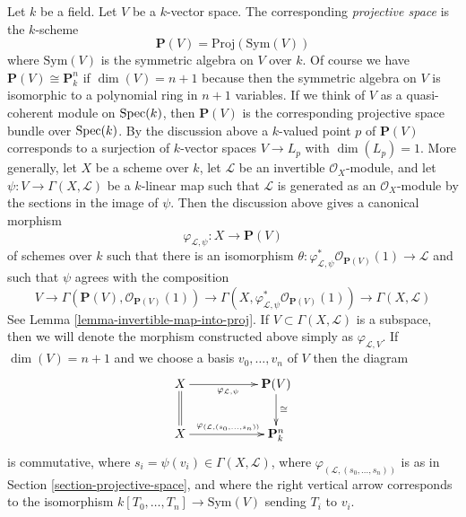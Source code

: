\begin{example}
\label{example-projective-space}
Let $k$ be a field. Let $V$ be a $k$-vector space. The corresponding
{\it projective space} is the $k$-scheme
$$
\mathbf{P}(V) = \text{Proj}(\text{Sym}(V))
$$
where $\text{Sym}(V)$ is the symmetric algebra on $V$ over $k$.
Of course we have $\mathbf{P}(V) \cong \mathbf{P}^n_k$ if $\dim(V) = n + 1$
because then the symmetric algebra on $V$ is isomorphic to a polynomial
ring in $n + 1$ variables. If we
think of $V$ as a quasi-coherent module on $\mathop{\mathrm{Spec}}(k)$, then $\mathbf{P}(V)$
is the corresponding projective space bundle over $\mathop{\mathrm{Spec}}(k)$. By the
discussion above a $k$-valued point $p$ of $\mathbf{P}(V)$ corresponds to
a surjection of $k$-vector spaces $V \to L_p$ with $\dim(L_p) = 1$.
More generally, let $X$ be a scheme over $k$, let $\mathcal{L}$ be an
invertible $\mathcal{O}_X$-module, and let
$\psi : V \to \Gamma(X, \mathcal{L})$ be a $k$-linear map
such that $\mathcal{L}$ is generated as an $\mathcal{O}_X$-module
by the sections in the image of $\psi$. Then the discussion above
gives a canonical morphism
$$
\varphi_{\mathcal{L}, \psi} : X \longrightarrow \mathbf{P}(V)
$$
of schemes over $k$ such that there is an isomorphism
$\theta : \varphi_{\mathcal{L}, \psi}^*\mathcal{O}_{\mathbf{P}(V)}(1)
\to \mathcal{L}$ and such that $\psi$ agrees with the composition
$$
V \to
\Gamma(\mathbf{P}(V), \mathcal{O}_{\mathbf{P}(V)}(1))
\to
\Gamma(X, \varphi_{\mathcal{L}, \psi}^*\mathcal{O}_{\mathbf{P}(V)}(1))
\to
\Gamma(X, \mathcal{L})
$$
See Lemma \ref{lemma-invertible-map-into-proj}. If
$V \subset \Gamma(X, \mathcal{L})$ is a subspace, then we will
denote the morphism constructed above simply as
$\varphi_{\mathcal{L}, V}$.
If $\dim(V) = n + 1$ and we choose a basis $v_0, \ldots, v_n$ of $V$
then the diagram
$$
\xymatrix{
X \ar@{=}[d] \ar[rr]_{\varphi_{\mathcal{L}, \psi}} & &
\mathbf{P}(V) \ar[d]^{\cong} \\
X \ar[rr]^{\varphi_{(\mathcal{L}, (s_0, \ldots, s_n))}} & &
\mathbf{P}^n_k
}
$$
is commutative, where $s_i = \psi(v_i) \in \Gamma(X, \mathcal{L})$, where
$\varphi_{(\mathcal{L}, (s_0, \ldots, s_n))}$
is as in Section \ref{section-projective-space},
and where the right vertical arrow corresponds
to the isomorphism $k[T_0, \ldots, T_n] \to \text{Sym}(V)$ sending
$T_i$ to $v_i$.
\end{example}

